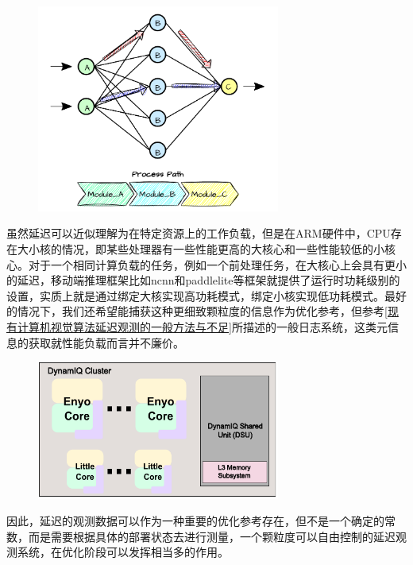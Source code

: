 \documentclass[master]{shtthesis}
\begin{document}
\begin{figure}[htbp]
	\centering
	\includegraphics[width=8cm]{img/path.pdf}
	\label{ABCpath}
\end{figure}


虽然延迟可以近似理解为在特定资源上的工作负载，但是在ARM硬件中，CPU存在大小核的情况，即某些处理器有一些性能更高的大核心和一些性能较低的小核心。对于一个相同计算负载的任务，例如一个前处理任务，在大核心上会具有更小的延迟，移动端推理框架比如ncnn和paddlelite等框架\cite{febvay2020low}就提供了运行时功耗级别的设置，实质上就是通过绑定大核实现高功耗模式，绑定小核实现低功耗模式。最好的情况下，我们还希望能捕获这种更细致颗粒度的信息作为优化参考，但参考\ref{现有计算机视觉算法延迟观测的一般方法与不足}所描述的一般日志系统，这类元信息的获取就性能负载而言并不廉价。

\begin{figure}[htbp]
	\centering
	\includegraphics[width=8cm]{img/arm.pdf}
	\label{ARM的大小核架构}
\end{figure}

因此，延迟的观测数据可以作为一种重要的优化参考存在，但不是一个确定的常数，而是需要根据具体的部署状态去进行测量，一个颗粒度可以自由控制的延迟观测系统，在优化阶段可以发挥相当多的作用。
\end{document}
